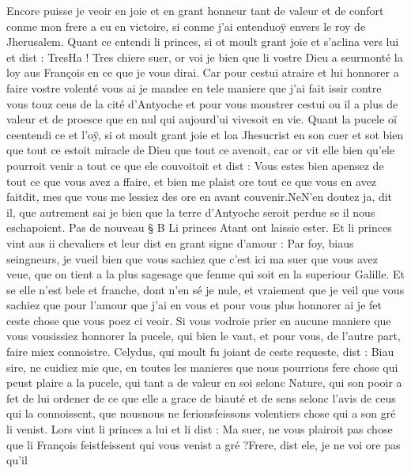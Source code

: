 \documentclass{article}
\begin{document}
\begin{pages}
   Encore puisse je veoir en joie et en grant honneur tant de valeur et de confort 
      conme mon frere a eu en victoire, 
      si conme j’ai entenduoÿ envers 
   le roy de Jherusalem. \pend
\pstart Quant ce entendi li princes, si ot moult grant joie 
   et s’aclina vers lui et dist :
   TresHa ! Tres chiere suer, or voi je bien 
      que li vostre Dieu a seurmonté la loy aus François en ce que je vous dirai. 
   Car pour cestui atraire et lui honnorer a faire vostre volenté vous ai je mandee en tele maniere que j’ai fait issir contre vous 
   touz ceus de la cité d’Antyoche et pour vous moustrer cestui ou il a plus de valeur 
      et de proesce que en nul qui aujourd’ui vivesoit en vie.
   Quant la pucele oï ceentendi ce et l'oÿ, 
   si ot moult grant joie et loa Jhesucrist en son cuer 
   et sot bien que tout ce estoit miracle de Dieu que tout ce avenoit, car or vit elle bien qu'ele pourroit venir a tout ce 
   que ele couvoitoit et dist :
   Vous estes bien apensez de tout ce que vous avez a ffaire, et bien me plaist ore tout ce que vous en 
      avez faitdit, mes que vous me lessiez des ore en avant couvenir.NeN'en doutez ja, dit il, que autrement 
      sai je bien que la terre d’Antyoche seroit perdue se il nous eschapoient. \pend
\pstart Pas de nouveau § B
   Li princes
      Atant ont laissie ester. Et li princes 
   vint aus ii chevaliers et leur dist en grant signe d’amour :
   Par foy, biaus seingneurs, je vueil bien que vous sachiez que c’est ici 
      ma suer que vous avez veue, que on tient a la plus 
      sagesage que 
      fenme qui soit en la 
      superiour Galille. Et se elle n’est bele et franche, dont n’en sé je nule, 
      et vraiement que je veil que vous sachiez que pour l’amour que j’ai en vous 
   et pour vous plus honnorer ai je fet ceste chose que vous poez ci veoir. 
      Si vous vodroie prier en aucune maniere que vous vousissiez 
   honnorer la pucele, qui bien le vaut, et pour vous, de l’autre part, faire miex connoistre. \pend
\pstart Celydus, qui moult fu joiant de ceste requeste, dist :
   Biau sire, ne cuidiez mie que, en toutes les manieres que nous pourrions fere chose qui 
      peust plaire a la pucele, qui tant a de valeur en soi selonc Nature, qui son pooir a fet 
      de lui ordener de ce que elle a grace de biauté et de sens selonc l’avis de ceus qui la connoissent, que 
      nousnous ne 
      ferionsfeissons volentiers 
      chose qui a son gré li venist.
   Lors vint li princes a lui et li dist :
   Ma suer, ne vous plairoit pas chose que li 
      François feistfeissent qui vous venist a gré ?Frere, dist ele, je ne voi ore pas qu’il 

\end{pages}
\end{document}
